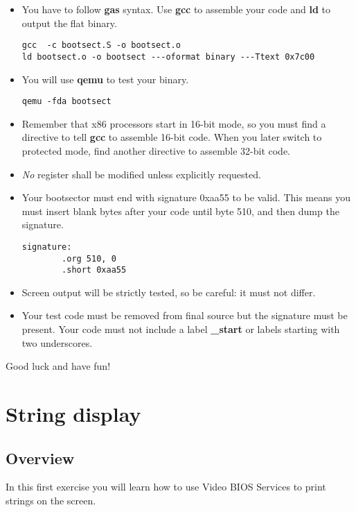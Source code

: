 \begin{itemize}
\item
  You have to follow \textbf{gas} syntax. Use \textbf{gcc} to assemble your
  code and \textbf{ld} to output the flat binary.
  \begin{verbatim}
gcc  -c bootsect.S -o bootsect.o
ld bootsect.o -o bootsect ---oformat binary ---Ttext 0x7c00
  \end{verbatim}
\item
  You will use \textbf{qemu} to test your binary.
  \begin{verbatim}
qemu -fda bootsect
  \end{verbatim}
\item
  Remember that x86 processors start in 16-bit mode, so you must find a
  directive to tell \textbf{gcc} to assemble 16-bit code. When you later
  switch to protected mode, find another directive to assemble 32-bit code.
\item
  \emph{No} register shall be modified unless explicitly requested.
\item
  Your bootsector must end with signature 0xaa55 to be valid. This means you
  must insert blank bytes after your code until byte 510, and then dump
  the signature.
  \begin{verbatim}
signature:
        .org 510, 0
        .short 0xaa55
  \end{verbatim}
\item
  Screen output will be strictly tested, so be careful: it must not differ.
\item
  Your test code must be removed from final source but the signature must be
  present. Your code must not include a label \textbf{\_start} or labels
  starting with two underscores.
\end{itemize}

Good luck and have fun!

%
%

\newpage

\section{String display}

\subsection*{Overview}
In this first exercise you will learn how to use Video BIOS Services to
print strings on the screen.

